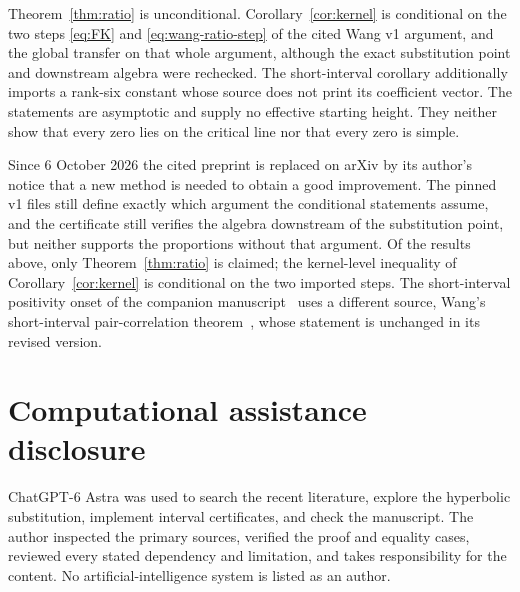 \documentclass[11pt]{article}
\theoremstyle{remark}
\begin{document}
Theorem~\ref{thm:ratio} is unconditional.  Corollary~\ref{cor:kernel} is
conditional on the two steps \eqref{eq:FK} and \eqref{eq:wang-ratio-step} of the
cited Wang v1 argument, and the global transfer on that whole argument, although the exact
substitution point and downstream algebra were rechecked.  The short-interval
corollary additionally imports a rank-six constant whose source does not print
its coefficient vector.  The statements are asymptotic and supply no
effective starting height.  They neither show that every zero lies on the
critical line nor that every zero is simple.

Since 6 October 2026 the cited preprint is replaced on arXiv by its author's
notice that a new method is needed to obtain a good improvement.  The pinned
v1 files still define exactly which argument the conditional statements
assume, and the certificate still verifies the algebra downstream of the
substitution point, but neither supports the proportions without that
argument.  Of the results above, only Theorem~\ref{thm:ratio} is claimed; the
kernel-level inequality of Corollary~\ref{cor:kernel} is conditional on the two
imported steps.  The short-interval positivity onset of the companion
manuscript~\cite{CAOSShort} uses a different source, Wang's short-interval
pair-correlation theorem~\cite{WangShort}, whose statement is unchanged in its
revised version.

\section*{Computational assistance disclosure}

ChatGPT-6 Astra was used to search the recent literature, explore the
hyperbolic substitution, implement interval certificates, and check the
manuscript.  The author inspected the primary sources, verified the proof and
equality cases, reviewed every stated dependency and limitation, and takes
responsibility for the content.  No artificial-intelligence system is listed
as an author.
\end{document}

